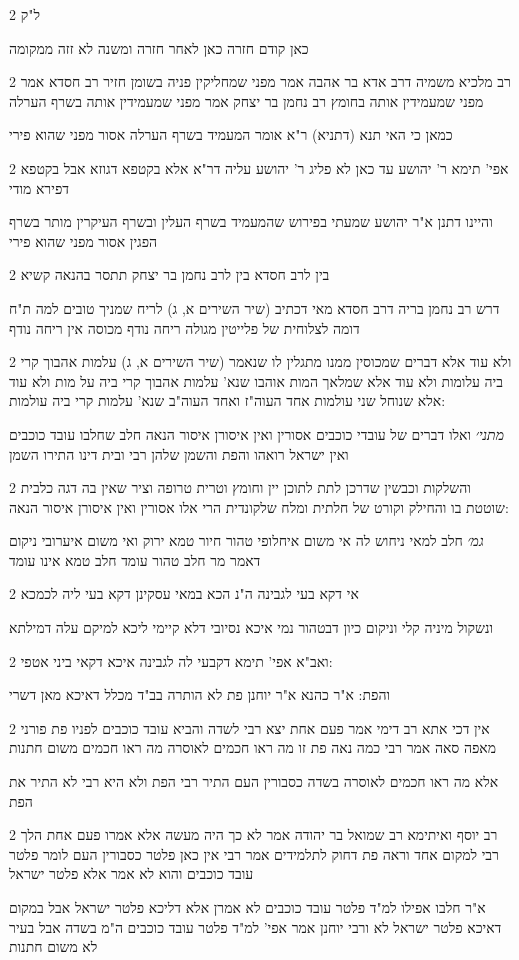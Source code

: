 \documentclass[12pt, openany]{book}
\newcommand{\sethebfont}{
\fontsize{10.5pt}{21.0pt} \selectfont
}
\newcommand{\twocol}[1]{
	{\sethebfont \begin{multicols}{2}
			#1
	\end{multicols}}	
}
\begin{document}
\twocol{ל"ק
\par כאן קודם חזרה כאן לאחר חזרה ומשנה לא זזה ממקומה}
\twocol{רב מלכיא משמיה דרב אדא בר אהבה אמר מפני שמחליקין פניה בשומן חזיר רב חסדא אמר מפני שמעמידין אותה בחומץ רב נחמן בר יצחק אמר מפני שמעמידין אותה בשרף הערלה
\par כמאן כי האי תנא (דתניא) ר"א אומר המעמיד בשרף הערלה אסור מפני שהוא פירי}
\twocol{אפי' תימא ר' יהושע עד כאן לא פליג ר' יהושע עליה דר"א אלא בקטפא דגוזא אבל בקטפא דפירא מודי
\par והיינו דתנן א"ר יהושע שמעתי בפירוש שהמעמיד בשרף העלין ובשרף העיקרין מותר בשרף הפגין אסור מפני שהוא פירי}
\twocol{בין לרב חסדא בין לרב נחמן בר יצחק תתסר בהנאה קשיא
\par דרש רב נחמן בריה דרב חסדא מאי דכתיב (שיר השירים א, ג) לריח שמניך טובים למה ת"ח דומה לצלוחית של פלייטין מגולה ריחה נודף מכוסה אין ריחה נודף}
\twocol{ולא עוד אלא דברים שמכוסין ממנו מתגלין לו שנאמר (שיר השירים א, ג) עלמות אהבוך קרי ביה עלומות ולא עוד אלא שמלאך המות אוהבו שנא' עלמות אהבוך קרי ביה על מות ולא עוד אלא שנוחל שני עולמות אחד העוה"ז ואחד העוה"ב שנא' עלמות קרי ביה עולמות:
\par {\large\emph{מתני׳}} ואלו דברים של עובדי כוכבים אסורין ואין איסורן איסור הנאה חלב שחלבו עובד כוכבים ואין ישראל רואהו והפת והשמן שלהן רבי ובית דינו התירו השמן}
\twocol{והשלקות וכבשין שדרכן לתת לתוכן יין וחומץ וטרית טרופה וציר שאין בה דגה כלבית שוטטת בו והחילק וקורט של חלתית ומלח שלקונדית הרי אלו אסורין ואין איסורן איסור הנאה:
\par {\large\emph{גמ׳}} חלב למאי ניחוש לה אי משום איחלופי טהור חיור טמא ירוק ואי משום איערובי ניקום דאמר מר חלב טהור עומד חלב טמא אינו עומד}
\twocol{אי דקא בעי לגבינה ה"נ הכא במאי עסקינן דקא בעי ליה לכמכא
\par ונשקול מיניה קלי וניקום כיון דבטהור נמי איכא נסיובי דלא קיימי ליכא למיקם עלה דמילתא}
\twocol{ואב"א אפי' תימא דקבעי לה לגבינה איכא דקאי ביני אטפי:
\par והפת: א"ר כהנא א"ר יוחנן פת לא הותרה בב"ד מכלל דאיכא מאן דשרי}
\twocol{אין דכי אתא רב דימי אמר פעם אחת יצא רבי לשדה והביא עובד כוכבים לפניו פת פורני מאפה סאה אמר רבי כמה נאה פת זו מה ראו חכמים לאוסרה מה ראו חכמים משום חתנות
\par אלא מה ראו חכמים לאוסרה בשדה כסבורין העם התיר רבי הפת ולא היא רבי לא התיר את הפת}
\twocol{רב יוסף ואיתימא רב שמואל בר יהודה אמר לא כך היה מעשה אלא אמרו פעם אחת הלך רבי למקום אחד וראה פת דחוק לתלמידים אמר רבי אין כאן פלטר כסבורין העם לומר פלטר עובד כוכבים והוא לא אמר אלא פלטר ישראל
\par א"ר חלבו אפילו למ"ד פלטר עובד כוכבים לא אמרן אלא דליכא פלטר ישראל אבל במקום דאיכא פלטר ישראל לא ורבי יוחנן אמר אפי' למ"ד פלטר עובד כוכבים ה"מ בשדה אבל בעיר לא משום חתנות}
\end{document}
